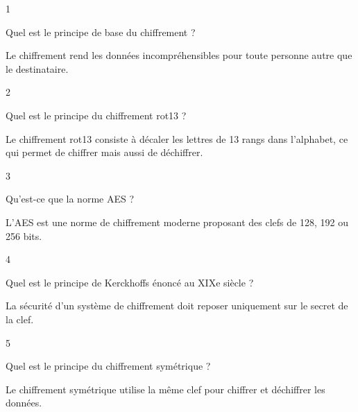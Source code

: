 
\begin{taggedblock}{1}
\begin{exoq}
Quel est le principe de base du chiffrement ?
\end{exoq} 
\begin{exor}
Le chiffrement rend les données incompréhensibles pour toute personne autre que le destinataire. \bqr
\end{exor} 
\end{taggedblock}

\begin{taggedblock}{2}
\begin{exoq}
Quel est le principe du chiffrement rot13 ?
\end{exoq} 
\begin{exor}
Le chiffrement rot13 consiste à décaler les lettres de 13 rangs dans l'alphabet, ce qui permet de chiffrer mais aussi de déchiffrer. \bqr
\end{exor} 
\end{taggedblock}

\begin{taggedblock}{3}
\begin{exoq}
Qu'est-ce que la norme AES ?
\end{exoq} 
\begin{exor}
L'AES est une norme de chiffrement moderne proposant des clefs de 128, 192 ou 256 bits. \bqr
\end{exor} 
\end{taggedblock}

\begin{taggedblock}{4}
\begin{exoq}
Quel est le principe de Kerckhoffs énoncé au XIXe siècle ?
\end{exoq} 
\begin{exor}
La sécurité d'un système de chiffrement doit reposer uniquement sur le secret de la clef. \bqr
\end{exor} 
\end{taggedblock}

\begin{taggedblock}{5}
\begin{exoq}
Quel est le principe du chiffrement symétrique ?
\end{exoq} 
\begin{exor}
Le chiffrement symétrique utilise la même clef pour chiffrer et déchiffrer les données. \bqr
\end{exor} 
\end{taggedblock}

